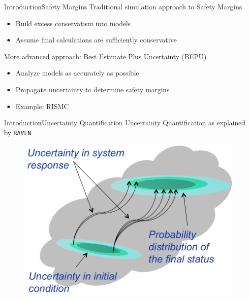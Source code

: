 \documentclass{beamer}
\newcommand{\raven}{\texttt{RAVEN}}
\begin{document}
\begin{frame}{Introduction}{Safety Margins}\vspace{-10pt}
  Traditional simulation approach to Safety Margins
  \vfill
  \begin{itemize}
    \item Build excess conservatism into models
    \item Assume final calculations are sufficiently conservative
  \end{itemize}
  \vfill
  More advanced approach: Best Estimate Plus Uncertainty (BEPU)
  \vfill
  \begin{itemize}
    \item Analyze models as accurately as possible
    \item Propagate uncertainty to determine safety margins
    \item Example: RISMC
  \end{itemize}
  \vfill
\end{frame}

\begin{frame}{Introduction}{Uncertainty Quantification}
  Uncertainty Quantification as explained by \raven{}
  \begin{figure}[h!]
    \centering
    \includegraphics[width=0.7\linewidth]{present/uq}
  \end{figure}
\end{frame}
\end{document}
